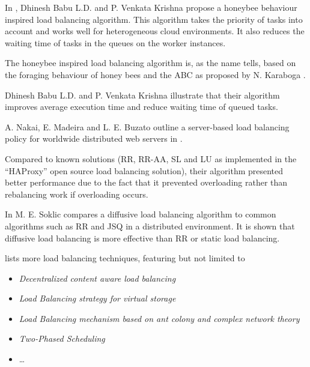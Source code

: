 In \cite{honeybee}, Dhinesh Babu L.D. and P. Venkata Krishna propose a honeybee
behaviour inspired load balancing algorithm.
This algorithm takes the priority of tasks into account and works well for
heterogeneous cloud environments.
It also reduces the waiting time of tasks in the queues on the worker instances.

The honeybee inspired load balancing algorithm is, as the name tells, based on
the foraging behaviour of honey bees and the \ac{ABC} as proposed by
N. Karaboga \cite{honeybee}.

Dhinesh Babu L.D. and P. Venkata Krishna illustrate that their algorithm
improves average execution time and reduce waiting time of queued tasks.

A. Nakai, E. Madeira and L. E. Buzato outline a server-based load balancing
policy for worldwide distributed web servers in \cite{nakai}.

Compared to known solutions (\ac{RR}, \ac{RR-AA}, \ac{SL} and \ac{LU} as
implemented in the ``HAProxy'' open source load balancing solution), their
algorithm presented better performance due to the fact that it
prevented overloading rather than rebalancing work if overloading occurs.

In \cite{simulOfLBA} M. E. Soklic compares a diffusive load balancing algorithm
to common algorithms such as \ac{RR} and \ac{JSQ} in a distributed environment.
It is shown that diffusive load balancing is more effective than \ac{RR} or
static load balancing.

\cite{cloudLBTech} lists more load balancing techniques, featuring but not
limited to
\begin{itemize}
    \item \emph{Decentralized content aware load balancing}
    \item \emph{Load Balancing strategy for virtual storage}
    \item \emph{Load Balancing mechanism based on ant colony and complex network
        theory}
    \item \emph{Two-Phased Scheduling}
    \item \dots
\end{itemize}

